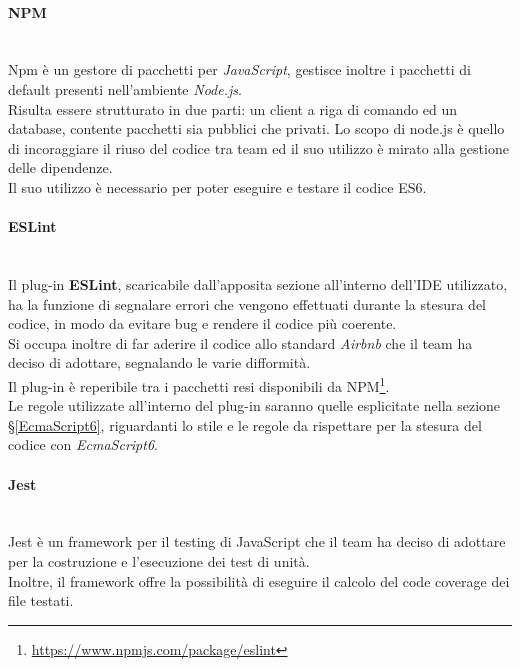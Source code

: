 \paragraph{NPM}\-\\
\label{NPM}
Npm è un gestore di pacchetti per \textit{JavaScript}, gestisce inoltre i pacchetti di default presenti nell'ambiente \textit{Node.js}.\\
Risulta essere strutturato in due parti: un client a riga di comando ed un database, contente pacchetti sia pubblici che privati. Lo scopo di node.js è quello di incoraggiare il riuso del codice tra team ed il suo utilizzo è mirato alla gestione delle dipendenze.\\ 
Il suo utilizzo è necessario per poter eseguire e testare il codice ES6.

\paragraph{ESLint}\-\\
Il plug-in \textbf{ESLint}, scaricabile dall'apposita sezione all'interno dell'IDE utilizzato, ha la funzione di segnalare errori che vengono effettuati durante la stesura del codice, in modo da evitare bug e rendere il codice più coerente. \\ 
Si occupa inoltre di far aderire il codice allo standard \textit{Airbnb} che il team ha deciso di adottare, segnalando le varie difformità.\\
Il plug-in è reperibile tra i pacchetti resi disponibili da NPM\footnote{\url{https://www.npmjs.com/package/eslint}}.\\
Le regole utilizzate all'interno del plug-in saranno quelle esplicitate nella sezione §\ref{EcmaScript6}, riguardanti lo stile e le regole da rispettare per la stesura del codice con \textit{EcmaScript6}.

\paragraph{Jest}\-\\
\label{jest}
Jest è un framework per il testing di JavaScript che il team ha deciso di adottare per la costruzione e l'esecuzione dei test di unità.\\
Inoltre, il framework offre la possibilità di eseguire il calcolo del code coverage dei file testati.

